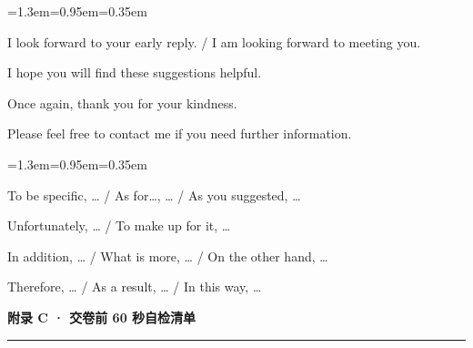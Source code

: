 \documentclass[10pt,a4paper]{ctexart}
\begin{document}
\par\vspace{1pt}
\begin{list}{}{\leftmargin=1.3em=0.95em=0.35em\itemindent=0pt\topsep=0pt\parsep=2pt\itemsep=2pt}
\item[{\color{accent}\scriptsize$\blacktriangleright$}]{\small I look forward to your early reply. / I am looking forward to meeting you.}
\item[{\color{accent}\scriptsize$\blacktriangleright$}]{\small I hope you will find these suggestions helpful.}
\item[{\color{accent}\scriptsize$\blacktriangleright$}]{\small Once again, thank you for your kindness.}
\item[{\color{accent}\scriptsize$\blacktriangleright$}]{\small Please feel free to contact me if you need further information.}
\end{list}\vspace{4pt}
\par\vspace{1pt}
\begin{list}{}{\leftmargin=1.3em=0.95em=0.35em\itemindent=0pt\topsep=0pt\parsep=2pt\itemsep=2pt}
\item[{\color{accent}\scriptsize$\blacktriangleright$}]{\small To be specific, … / As for…, … / As you suggested, …}
\item[{\color{accent}\scriptsize$\blacktriangleright$}]{\small Unfortunately, … / To make up for it, …}
\item[{\color{accent}\scriptsize$\blacktriangleright$}]{\small In addition, … / What is more, … / On the other hand, …}
\item[{\color{accent}\scriptsize$\blacktriangleright$}]{\small Therefore, … / As a result, … / In this way, …}
\end{list}\vspace{4pt}
\clearpage
\label{app:c}
{\color{accent}\bfseries\LARGE 附录 C · 交卷前 60 秒自检清单}\par\vspace{4pt}
{\color{accent}\rule{\linewidth}{1.2pt}}\par\vspace{5pt}
\par\vspace{4pt}
\par\vspace{1pt}
\end{document}
